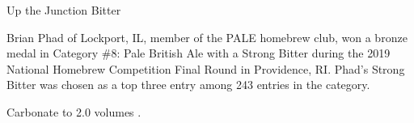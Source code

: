 \stylesection{\styleextraspecialstrongbitter}

\begin{recipie}{Up the Junction Bitter}

\begin{aboutblock}
Brian Phad of Lockport, IL, member of the PALE homebrew club, won a bronze medal in
Category \#8: Pale British Ale with a Strong Bitter during the 2019 National
Homebrew Competition Final Round in Providence, RI. Phad's Strong Bitter was chosen as
a top three entry among 243 entries in the category.
\end{aboutblock}


\begin{methodandtiming}
 
\begin{mashsteps}
\end{mashsteps}

\begin{fermentationsteps}
\end{fermentationsteps}

\begin{directions}
Carbonate to 2.0 volumes .
\end{directions}

\end{methodandtiming}

\pagebreak

\begin{ingredientsblock}

\begin{malts}
\end{malts}

\begin{hops}
\end{hops}

\begin{yeasts}
\end{yeasts}

\end{ingredientsblock}

\end{recipie}
